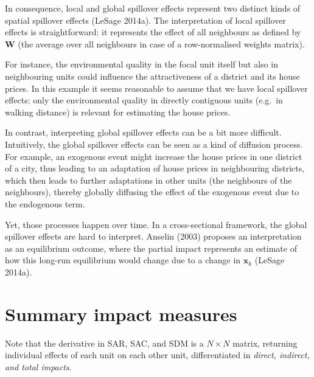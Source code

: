 \documentclass[
  letterpaper,
]{scrbook}
\begin{document}
In consequence, local and global spillover effects represent two
distinct kinds of spatial spillover effects (LeSage 2014a). The
interpretation of local spillover effects is straightforward: it
represents the effect of all neighbours as defined by
\({\boldsymbol{\mathbf{W}}}\) (the average over all neighbours in case
of a row-normalised weights matrix).

For instance, the environmental quality in the focal unit itself but
also in neighbouring units could influence the attractiveness of a
district and its house prices. In this example it seems reasonable to
assume that we have local spillover effects: only the environmental
quality in directly contiguous units (e.g.~in walking distance) is
relevant for estimating the house prices.

In contrast, interpreting global spillover effects can be a bit more
difficult. Intuitively, the global spillover effects can be seen as a
kind of diffusion process. For example, an exogenous event might
increase the house prices in one district of a city, thus leading to an
adaptation of house prices in neighbouring districts, which then leads
to further adaptations in other units (the neighbours of the
neighbours), thereby globally diffusing the effect of the exogenous
event due to the endogenous term.

Yet, those processes happen over time. In a cross-sectional framework,
the global spillover effects are hard to interpret. Anselin (2003)
proposes an interpretation as an equilibrium outcome, where the partial
impact represents an estimate of how this long-run equilibrium would
change due to a change in \({\boldsymbol{\mathbf{x}}}_k\) (LeSage
2014a).

\hypertarget{summary-impact-measures}{%
\section{Summary impact measures}\label{summary-impact-measures}}

Note that the derivative in SAR, SAC, and SDM is a \(N \times N\)
matrix, returning individual effects of each unit on each other unit,
differentiated in \emph{direct, indirect, and total impacts}.
\end{document}
